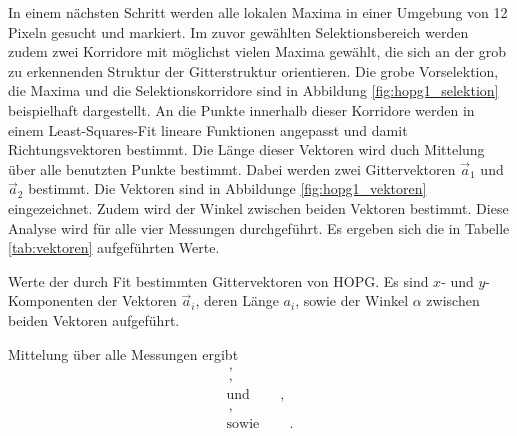 In einem nächsten Schritt werden alle lokalen Maxima in einer Umgebung von
\num{12} Pixeln gesucht und markiert. Im zuvor gewählten Selektionsbereich
werden zudem zwei Korridore mit möglichst vielen Maxima gewählt, die sich an
der grob zu erkennenden Struktur der Gitterstruktur orientieren.
Die grobe Vorselektion, die Maxima und die Selektionskorridore sind in
Abbildung \ref{fig:hopg1_selektion} beispielhaft dargestellt.
An die Punkte innerhalb dieser Korridore werden in einem Least-Squares-Fit
lineare Funktionen angepasst und damit Richtungsvektoren bestimmt. Die Länge
dieser Vektoren wird duch Mittelung über alle benutzten Punkte bestimmt.
Dabei werden zwei Gittervektoren $\vec{a}_1$ und $\vec{a}_2$ bestimmt.
Die Vektoren sind in Abbildunge \ref{fig:hopg1_vektoren} eingezeichnet.
Zudem wird der Winkel zwischen beiden Vektoren bestimmt.
Diese Analyse wird für alle vier Messungen durchgeführt. Es ergeben sich die
in Tabelle \ref{tab:vektoren} aufgeführten Werte.
\begin{table}
    \centering
    \caption{
        Werte der durch Fit bestimmten Gittervektoren von HOPG. Es sind $x$-
        und $y$-Komponenten der Vektoren $\vec{a}_i$, deren Länge $a_i$, sowie
        der Winkel $\alpha$ zwischen beiden Vektoren aufgeführt.
    }
    \label{tab:vektoren}
    
\end{table}
Mittelung über alle Messungen ergibt
\begin{align*}
    \,,\\
    \,,\\
    \text{und}\qquad\,,\\
    \,,\\
    \text{sowie}\qquad\,.
\end{align*}

